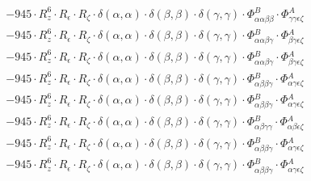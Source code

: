 \documentclass{article}
\begin{document}
\begin{subequations}
\begin{gather}
\begin{array}{c}
 \\[0.2em] 		 - 945 \cdot R_{z}^{6} \cdot R_{\epsilon{}} \cdot R_{\zeta{}} \cdot \delta{}\left(\alpha{}, \alpha{}\right) \cdot \delta{}\left(\beta{}, \beta{}\right) \cdot \delta{}\left(\gamma{}, \gamma{}\right) \cdot \Phi{}^{B}_{\alpha{}\alpha{}\beta{}\beta{}} \cdot \Phi{}^{A}_{\gamma{}\gamma{}\epsilon{}\zeta{}} 
 \\[0.2em] 		 - 945 \cdot R_{z}^{6} \cdot R_{\epsilon{}} \cdot R_{\zeta{}} \cdot \delta{}\left(\alpha{}, \alpha{}\right) \cdot \delta{}\left(\beta{}, \beta{}\right) \cdot \delta{}\left(\gamma{}, \gamma{}\right) \cdot \Phi{}^{B}_{\alpha{}\alpha{}\beta{}\gamma{}} \cdot \Phi{}^{A}_{\beta{}\gamma{}\epsilon{}\zeta{}} 
 \\[0.2em] 		 - 945 \cdot R_{z}^{6} \cdot R_{\epsilon{}} \cdot R_{\zeta{}} \cdot \delta{}\left(\alpha{}, \alpha{}\right) \cdot \delta{}\left(\beta{}, \beta{}\right) \cdot \delta{}\left(\gamma{}, \gamma{}\right) \cdot \Phi{}^{B}_{\alpha{}\alpha{}\beta{}\gamma{}} \cdot \Phi{}^{A}_{\beta{}\gamma{}\epsilon{}\zeta{}} 
 \\[0.2em] 		 - 945 \cdot R_{z}^{6} \cdot R_{\epsilon{}} \cdot R_{\zeta{}} \cdot \delta{}\left(\alpha{}, \alpha{}\right) \cdot \delta{}\left(\beta{}, \beta{}\right) \cdot \delta{}\left(\gamma{}, \gamma{}\right) \cdot \Phi{}^{B}_{\alpha{}\beta{}\beta{}\gamma{}} \cdot \Phi{}^{A}_{\alpha{}\gamma{}\epsilon{}\zeta{}} 
 \\[0.2em] 		 - 945 \cdot R_{z}^{6} \cdot R_{\epsilon{}} \cdot R_{\zeta{}} \cdot \delta{}\left(\alpha{}, \alpha{}\right) \cdot \delta{}\left(\beta{}, \beta{}\right) \cdot \delta{}\left(\gamma{}, \gamma{}\right) \cdot \Phi{}^{B}_{\alpha{}\beta{}\beta{}\gamma{}} \cdot \Phi{}^{A}_{\alpha{}\gamma{}\epsilon{}\zeta{}} 
 \\[0.2em] 		 - 945 \cdot R_{z}^{6} \cdot R_{\epsilon{}} \cdot R_{\zeta{}} \cdot \delta{}\left(\alpha{}, \alpha{}\right) \cdot \delta{}\left(\beta{}, \beta{}\right) \cdot \delta{}\left(\gamma{}, \gamma{}\right) \cdot \Phi{}^{B}_{\alpha{}\beta{}\gamma{}\gamma{}} \cdot \Phi{}^{A}_{\alpha{}\beta{}\epsilon{}\zeta{}} 
 \\[0.2em] 		 - 945 \cdot R_{z}^{6} \cdot R_{\epsilon{}} \cdot R_{\zeta{}} \cdot \delta{}\left(\alpha{}, \alpha{}\right) \cdot \delta{}\left(\beta{}, \beta{}\right) \cdot \delta{}\left(\gamma{}, \gamma{}\right) \cdot \Phi{}^{B}_{\alpha{}\beta{}\beta{}\gamma{}} \cdot \Phi{}^{A}_{\alpha{}\gamma{}\epsilon{}\zeta{}} 
 \\[0.2em] 		 - 945 \cdot R_{z}^{6} \cdot R_{\epsilon{}} \cdot R_{\zeta{}} \cdot \delta{}\left(\alpha{}, \alpha{}\right) \cdot \delta{}\left(\beta{}, \beta{}\right) \cdot \delta{}\left(\gamma{}, \gamma{}\right) \cdot \Phi{}^{B}_{\alpha{}\beta{}\beta{}\gamma{}} \cdot \Phi{}^{A}_{\alpha{}\gamma{}\epsilon{}\zeta{}} 

\end{array}
\end{gather}
\end{subequations}
\end{document}
